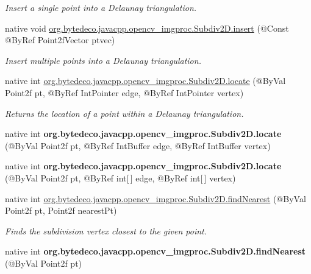 \begin{DoxyCompactItemize}
\begin{DoxyCompactList}\small\item\em Insert a single point into a Delaunay triangulation. \end{DoxyCompactList}\item 
native void \hyperlink{group__imgproc_gaf5f1f193cf48fd1c0b5db28cd98980bd}{org.\+bytedeco.\+javacpp.\+opencv\+\_\+imgproc.\+Subdiv2\+D.\+insert} (@Const @By\+Ref Point2f\+Vector ptvec)
\begin{DoxyCompactList}\small\item\em Insert multiple points into a Delaunay triangulation. \end{DoxyCompactList}\item 
native int \hyperlink{group__imgproc_gaa9df1660d91df22b6555929190798bbc}{org.\+bytedeco.\+javacpp.\+opencv\+\_\+imgproc.\+Subdiv2\+D.\+locate} (@By\+Val Point2f pt, @By\+Ref Int\+Pointer edge, @By\+Ref Int\+Pointer vertex)
\begin{DoxyCompactList}\small\item\em Returns the location of a point within a Delaunay triangulation. \end{DoxyCompactList}\item 
\mbox{\label{group__imgproc_ga4dabe651921cd62b2dfb6cc9d1c89646}} 
native int {\bfseries org.\+bytedeco.\+javacpp.\+opencv\+\_\+imgproc.\+Subdiv2\+D.\+locate} (@By\+Val Point2f pt, @By\+Ref Int\+Buffer edge, @By\+Ref Int\+Buffer vertex)
\item 
\mbox{\label{group__imgproc_gad1f5b9f1a4037ae49a6182a83e6573d4}} 
native int {\bfseries org.\+bytedeco.\+javacpp.\+opencv\+\_\+imgproc.\+Subdiv2\+D.\+locate} (@By\+Val Point2f pt, @By\+Ref int\mbox{[}$\,$\mbox{]} edge, @By\+Ref int\mbox{[}$\,$\mbox{]} vertex)
\item 
native int \hyperlink{group__imgproc_gaf945545a23188d47dc1fdfb4332707be}{org.\+bytedeco.\+javacpp.\+opencv\+\_\+imgproc.\+Subdiv2\+D.\+find\+Nearest} (@By\+Val Point2f pt, Point2f nearest\+Pt)
\begin{DoxyCompactList}\small\item\em Finds the subdivision vertex closest to the given point. \end{DoxyCompactList}\item 
\mbox{\label{group__imgproc_ga0a345bbd754ff621754c9b78b110cbfd}} 
native int {\bfseries org.\+bytedeco.\+javacpp.\+opencv\+\_\+imgproc.\+Subdiv2\+D.\+find\+Nearest} (@By\+Val Point2f pt)

\end{DoxyCompactItemize}
